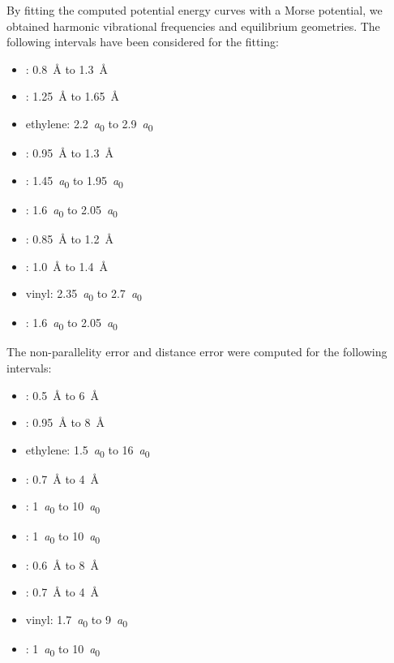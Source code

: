 \documentclass[aip,jcp,preprint,noshowkeys,superscriptaddress]{revtex4-1}
\begin{document}

By fitting the computed potential energy curves with a Morse potential, we obtained harmonic vibrational frequencies and equilibrium geometries.
The following intervals have been considered for the fitting:
\begin{itemize}
\item {}: \SI{0.8}{\angstrom} to \SI{1.3}{\angstrom}
\item {}: \SI{1.25}{\angstrom} to \SI{1.65}{\angstrom}
\item ethylene: \SI{2.2}{\bohr} to \SI{2.9}{\bohr}
\item {}: \SI{0.95}{\angstrom} to \SI{1.3}{\angstrom}
\item {}: \SI{1.45}{\bohr} to \SI{1.95}{\bohr}
\item {}: \SI{1.6}{\bohr} to \SI{2.05}{\bohr}
\item {}: \SI{0.85}{\angstrom} to \SI{1.2}{\angstrom}
\item {}: \SI{1.0}{\angstrom} to \SI{1.4}{\angstrom}
\item vinyl: \SI{2.35}{\bohr} to \SI{2.7}{\bohr}
\item {}: \SI{1.6}{\bohr} to \SI{2.05}{\bohr}
\end{itemize}

The non-parallelity error and distance error were computed for the following intervals:
\begin{itemize}
\item {}: \SI{0.5}{\angstrom} to \SI{6}{\angstrom}
\item {}: \SI{0.95}{\angstrom} to \SI{8}{\angstrom}
\item ethylene: \SI{1.5}{\bohr} to \SI{16}{\bohr}
\item {}: \SI{0.7}{\angstrom} to \SI{4}{\angstrom}
\item {}: \SI{1}{\bohr} to \SI{10}{\bohr}
\item {}: \SI{1}{\bohr} to \SI{10}{\bohr}
\item {}: \SI{0.6}{\angstrom} to \SI{8}{\angstrom}
\item {}: \SI{0.7}{\angstrom} to \SI{4}{\angstrom}
\item vinyl: \SI{1.7}{\bohr} to \SI{9}{\bohr}
\item {}: \SI{1}{\bohr} to \SI{10}{\bohr}
\end{itemize}
\end{document}
